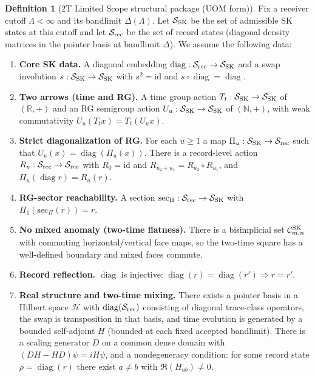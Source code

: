 \documentclass[10pt]{article}
\theoremstyle{definition}
\newtheorem{definition}{Definition}[section]
\theoremstyle{plain}
\begin{document}
\begin{definition}[2T Limited Scope structural package (UOM form)]
\label{def:uom-limited-scope-package}
Fix a receiver cutoff $\Lambda<\infty$ and its bandlimit $\Delta(\Lambda)$.
Let $\mathcal S_{\rm SK}$ be the set of admissible SK states at this cutoff and
let $\mathcal S_{\rm rec}$ be the set of record states (diagonal density matrices in the pointer basis at bandlimit $\Delta$).
We assume the following data:
\begin{enumerate}[label=\textbf{(A\arabic*)},leftmargin=*,itemsep=0.4em]
\item \textbf{Core SK data.}
A diagonal embedding $\operatorname{diag}:\mathcal S_{\rm rec}\to\mathcal S_{\rm SK}$ and a swap involution
$s:\mathcal S_{\rm SK}\to\mathcal S_{\rm SK}$ with $s^2=\mathrm{id}$ and $s\circ\operatorname{diag}=\operatorname{diag}$.

\item \textbf{Two arrows (time and RG).}
A time group action $T_t:\mathcal S_{\rm SK}\to\mathcal S_{\rm SK}$ of $(\mathbb R,+)$ and an RG semigroup action
$U_u:\mathcal S_{\rm SK}\to\mathcal S_{\rm SK}$ of $(\mathbb N,+)$,
with weak commutativity $U_u(T_t x)=T_t(U_u x)$.

\item \textbf{Strict diagonalization of RG.}
For each $u\ge 1$ a map $\Pi_u:\mathcal S_{\rm SK}\to\mathcal S_{\rm rec}$ such that
$U_u(x)=\operatorname{diag}(\Pi_u(x))$. There is a record-level action
$R_u:\mathcal S_{\rm rec}\to\mathcal S_{\rm rec}$ with $R_0=\mathrm{id}$ and
$R_{u_2+u_1}=R_{u_2}\circ R_{u_1}$, and
$\Pi_u(\operatorname{diag} r)=R_u(r)$.

\item \textbf{RG-sector reachability.}
A section $\mathrm{sec}_\Pi:\mathcal S_{\rm rec}\to\mathcal S_{\rm SK}$ with
$\Pi_1(\mathrm{sec}_\Pi(r))=r$.

\item \textbf{No mixed anomaly (two-time flatness).}
There is a bisimplicial set $\mathcal C^{\rm SK}_{m,n}$ with commuting horizontal/vertical face maps,
so the two-time square has a well-defined boundary and mixed faces commute.

\item \textbf{Record reflection.}
$\operatorname{diag}$ is injective: $\operatorname{diag}(r)=\operatorname{diag}(r')\Rightarrow r=r'$.

\item \textbf{Real structure and two-time mixing.}
There exists a pointer basis in a Hilbert space $\mathcal H$ with
$\operatorname{diag}(\mathcal S_{\rm rec})$ consisting of diagonal trace-class operators,
the swap is transposition in that basis, and time evolution is generated by a bounded
self-adjoint $H$ (bounded at each fixed accepted bandlimit). There is a scaling generator $D$ on a common dense domain with
$(DH-HD)\psi=iH\psi$, and a nondegeneracy condition: for some record state
$\rho=\operatorname{diag}(r)$ there exist $a\ne b$ with $\Re(H_{ab})\ne 0$.
\end{enumerate}
\end{definition}
\end{document}
